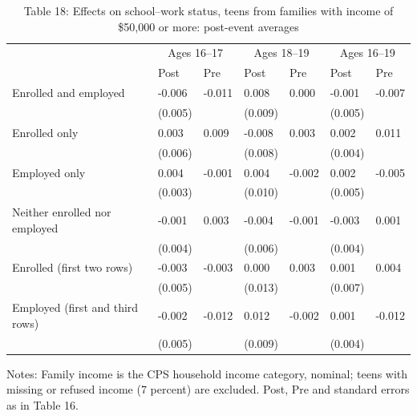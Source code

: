 \documentclass[12pt]{article}
\begin{document}
\begin{table}
\centering
\caption{Table 18: Effects on school--work status, teens from families with income of \$50,000 or more: post-event averages}

\small
\begin{tabular}{p{}p{}p{}p{}p{}p{}p{}}
\toprule
 & \multicolumn{2}{c}{Ages 16--17} & \multicolumn{2}{c}{Ages 18--19} & \multicolumn{2}{c}{Ages 16--19} \\

 & Post & Pre & Post & Pre & Post & Pre \\
\midrule
Enrolled and employed & -0.006 & -0.011 & 0.008 & 0.000 & -0.001 & -0.007 \\
 & (0.005) &  & (0.009) &  & (0.005) &  \\
Enrolled only & 0.003 & 0.009 & -0.008 & 0.003 & 0.002 & 0.011 \\
 & (0.006) &  & (0.008) &  & (0.004) &  \\
Employed only & 0.004 & -0.001 & 0.004 & -0.002 & 0.002 & -0.005 \\
 & (0.003) &  & (0.010) &  & (0.005) &  \\
Neither enrolled nor employed & -0.001 & 0.003 & -0.004 & -0.001 & -0.003 & 0.001 \\
 & (0.004) &  & (0.006) &  & (0.004) &  \\
Enrolled (first two rows) & -0.003 & -0.003 & 0.000 & 0.003 & 0.001 & 0.004 \\
 & (0.005) &  & (0.013) &  & (0.007) &  \\
Employed (first and third rows) & -0.002 & -0.012 & 0.012 & -0.002 & 0.001 & -0.012 \\
 & (0.005) &  & (0.009) &  & (0.004) &  \\
\bottomrule
\end{tabular}



\noindent\small Notes: Family income is the CPS household income category, nominal; teens with missing or refused income (7 percent) are excluded. Post, Pre and standard errors as in Table 16.

\end{table}
\end{document}
